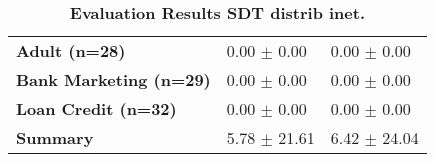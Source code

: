\begin{table}[htb]
{\begin{tabular}{lll}
\textbf{Adult (n=28)                             } &   \phantom{0}0.00 $\pm$ \phantom{0}0.00 &         \phantom{0}0.00 $\pm$ \phantom{0}0.00 \\
\textbf{Bank Marketing (n=29)                    } &   \phantom{0}0.00 $\pm$ \phantom{0}0.00 &         \phantom{0}0.00 $\pm$ \phantom{0}0.00 \\
\textbf{Loan Credit (n=32)                       } &   \phantom{0}0.00 $\pm$ \phantom{0}0.00 &         \phantom{0}0.00 $\pm$ \phantom{0}0.00 \\
\midrule
\textbf{Summary                                  } &             \phantom{0}5.78 $\pm$ 21.61 &                   \phantom{0}6.42 $\pm$ 24.04 \\
\bottomrule
\end{tabular}%
}
\caption{\textbf{Evaluation Results SDT distrib inet.}}
\label{tab:eval-results}
\end{table}



